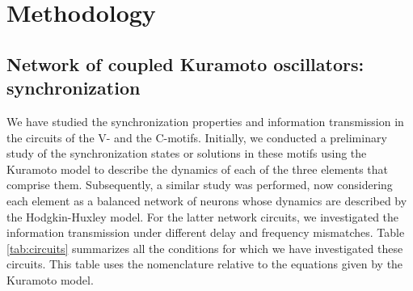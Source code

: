 \documentclass[../main.tex]{subfiles}
\begin{document}
\section{Methodology}
\subsection{Network of coupled Kuramoto oscillators: synchronization}
We have studied the synchronization properties and information transmission in the circuits of the V- and the C-motifs.
Initially, we conducted a preliminary study of the synchronization states or solutions in these motifs using the Kuramoto model \citep{kuramoto1975international} to describe the dynamics of each of the three elements that comprise them.
Subsequently, a similar study was performed, now considering each element as a balanced network of neurons whose dynamics are described by the Hodgkin-Huxley \citep{hodgkin_quantitative_1952} model.
For the latter network circuits, we investigated the information transmission under different delay and frequency mismatches.
Table \ref{tab:circuits} summarizes all the conditions for which we have investigated these circuits.
This table uses the nomenclature relative to the equations given by the Kuramoto model.
\end{document}
